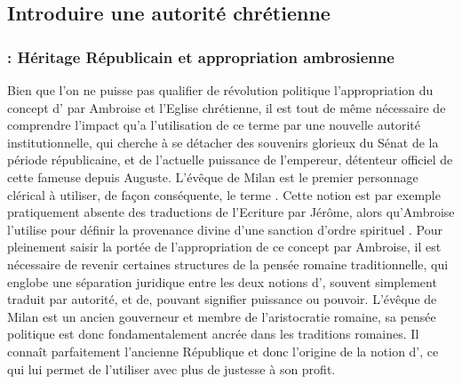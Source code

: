 \subsection{Introduire une autorité chrétienne}

\subsubsection{: Héritage Républicain et appropriation ambrosienne}

Bien que l’on ne puisse pas qualifier de révolution politique l’appropriation du concept d’ par Ambroise et l’Eglise chrétienne, il est tout de même nécessaire de comprendre l’impact qu’a l’utilisation de ce terme par une nouvelle autorité institutionnelle, qui cherche à se détacher des souvenirs glorieux du Sénat de la période républicaine, et de l’actuelle puissance de l’empereur, détenteur officiel de cette fameuse  depuis Auguste. L’évêque de Milan est le premier personnage clérical à utiliser, de façon conséquente, le terme . Cette notion est par exemple pratiquement absente des traductions de l’Ecriture par Jérôme, alors qu’Ambroise l’utilise pour définir la provenance divine d’une sanction d’ordre spirituel \autocite[214]{sassier_auctoritas}. Pour pleinement saisir la portée de l’appropriation de ce concept par Ambroise, il est nécessaire de revenir certaines structures de la pensée romaine traditionnelle, qui englobe une séparation juridique entre les deux notions d’, souvent simplement traduit par autorité, et de, pouvant signifier puissance ou pouvoir. L’évêque de Milan est un ancien gouverneur et membre de l’aristocratie romaine, sa pensée politique est donc fondamentalement ancrée dans les traditions romaines. Il connaît parfaitement l’ancienne République et donc l’origine de la notion d’, ce qui lui permet de l’utiliser avec plus de justesse à son profit.

\bigskip

